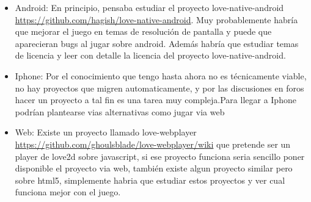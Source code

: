 \begin{itemize}

\item Android: En principio, pensaba estudiar el proyecto love-native-android \url{https://github.com/hagish/love-native-android}. Muy probablemente habría que mejorar el juego en temas de resolución de pantalla y puede que aparecieran bugs al jugar sobre android. Además habría que estudiar temas de licencia y leer con detalle la licencia del proyecto love-native-android.

\item Iphone: Por el conocimiento que tengo hasta ahora no es técnicamente viable, no hay proyectos que migren automaticamente, y por las discusiones en foros hacer un proyecto a tal fin es una tarea muy compleja.Para llegar a Iphone podrían plantearse vias alternativas como jugar via web

\item Web: Existe un proyecto llamado love-webplayer \url{https://github.com/ghoulsblade/love-webplayer/wiki} que pretende ser un player de love2d sobre javascript, si ese proyecto funciona seria sencillo poner disponible el proyecto via web, también existe algun proyecto similar pero sobre html5, simplemente habria que estudiar estos proyectos y ver cual funciona mejor con el juego.

\end{itemize}
